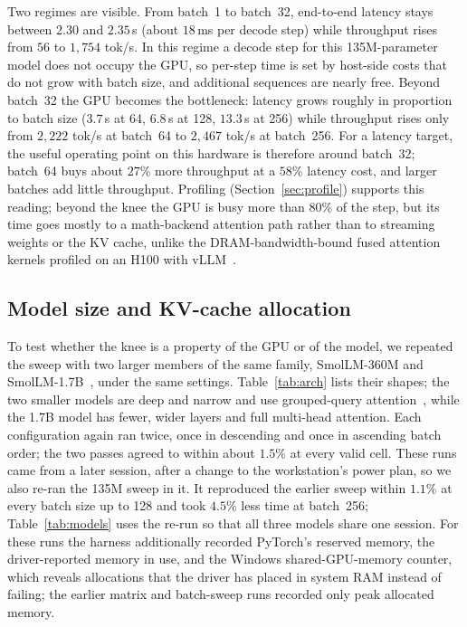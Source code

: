 \documentclass[11pt]{article}
\begin{document}
Two regimes are visible.
From batch~1 to batch~32, end-to-end latency stays between $2.30$ and $2.35$\,s (about $18$\,ms per decode step) while throughput rises from $56$ to $1{,}754$ tok/s.
In this regime a decode step for this 135M-parameter model does not occupy the GPU, so per-step time is set by host-side costs that do not grow with batch size, and additional sequences are nearly free.
Beyond batch~32 the GPU becomes the bottleneck: latency grows roughly in proportion to batch size ($3.7$\,s at 64, $6.8$\,s at 128, $13.3$\,s at 256) while throughput rises only from $2{,}222$ tok/s at batch~64 to $2{,}467$ tok/s at batch~256.
For a latency target, the useful operating point on this hardware is therefore around batch~32; batch~64 buys about $27\%$ more throughput at a $58\%$ latency cost, and larger batches add little throughput.
Profiling (Section~\ref{sec:profile}) supports this reading; beyond the knee the GPU is busy more than $80\%$ of the step, but its time goes mostly to a math-backend attention path rather than to streaming weights or the KV cache, unlike the DRAM-bandwidth-bound fused attention kernels profiled on an H100 with vLLM~\cite{recasens2025memorygap}.

\subsection{Model size and KV-cache allocation}
\label{sec:models}
To test whether the knee is a property of the GPU or of the model, we repeated the sweep with two larger members of the same family, SmolLM-360M and SmolLM-1.7B~\cite{allal2024smollm}, under the same settings.
Table~\ref{tab:arch} lists their shapes; the two smaller models are deep and narrow and use grouped-query attention~\cite{ainslie2023gqa}, while the 1.7B model has fewer, wider layers and full multi-head attention.
Each configuration again ran twice, once in descending and once in ascending batch order; the two passes agreed to within about $1.5\%$ at every valid cell.
These runs came from a later session, after a change to the workstation's power plan, so we also re-ran the 135M sweep in it.
It reproduced the earlier sweep within $1.1\%$ at every batch size up to 128 and took $4.5\%$ less time at batch~256; Table~\ref{tab:models} uses the re-run so that all three models share one session.
For these runs the harness additionally recorded PyTorch's reserved memory, the driver-reported memory in use, and the Windows shared-GPU-memory counter, which reveals allocations that the driver has placed in system RAM instead of failing; the earlier matrix and batch-sweep runs recorded only peak allocated memory.
\end{document}
